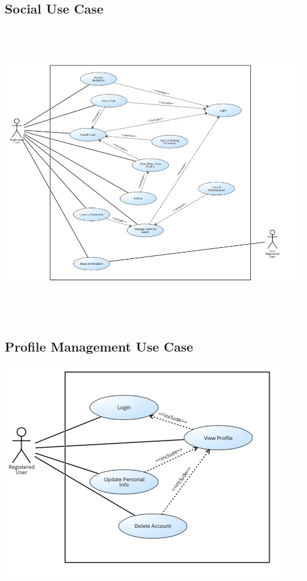 \documentclass[12pt]{book}
\begin{document}
\subsection{Social Use Case}
\begin{center}
\includegraphics[width=20cm,height=13cm]{socialUC}
\end{center}
\subsection{Profile Management Use Case}
\begin{center}
\includegraphics[scale=0.6]{profileManagementUC}
\end{center}
\end{document}
